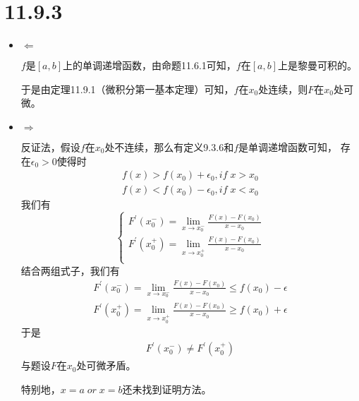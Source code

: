 \documentclass{article}
\begin{document}
\section*{11.9.3}

\begin{itemize}
  \item $\Leftarrow$

        $f$是$[a, b]$上的单调递增函数，由命题11.6.1可知，$f$在$[a, b]$上是黎曼可积的。

        于是由定理11.9.1（微积分第一基本定理）可知，$f$在$x_0$处连续，则$F$在$x_0$处可微。

  \item $\Rightarrow$

        反证法，假设$f$在$x_0$处不连续，那么有定义9.3.6和$f$是单调递增函数可知，
        存在$\epsilon_0 > 0$使得时
        \begin{align*}
          f(x) > f(x_0) + \epsilon_0, if \; x > x_0 \\
          f(x) < f(x_0) - \epsilon_0, if \; x < x_0
        \end{align*}
        我们有
        \begin{equation*}
          \begin{cases*}
            F^\prime(x_0^{-}) = \lim\limits_{x \to x_0^{-}} \frac{F(x) - F(x_0)}{x - x_0} \\
            F^\prime(x_0^{+}) = \lim\limits_{x \to x_0^{+}} \frac{F(x) - F(x_0)}{x - x_0}   \\
          \end{cases*}
        \end{equation*}
        结合两组式子，我们有
        \begin{align*}
            F^\prime(x_0^{-}) = \lim\limits_{x \to x_0^{-}} \frac{F(x) - F(x_0)}{x - x_0} \leq f(x_0) - \epsilon \\
            F^\prime(x_0^{+}) = \lim\limits_{x \to x_0^{+}} \frac{F(x) - F(x_0)}{x - x_0} \geq f(x_0) + \epsilon 
        \end{align*}
        于是
        \begin{align*}
          F^\prime(x_0^{-}) \neq F^\prime(x_0^{+})
        \end{align*}
        与题设$F$在$x_0$处可微矛盾。

        特别地，$x = a \; or \; x = b$还未找到证明方法。
\end{itemize}
\end{document}

